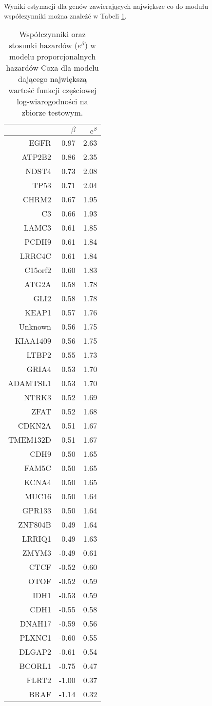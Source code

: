Wyniki estymacji dla genów zawierających największe co do modułu
współczynniki można znaleźć w Tabeli \ref{tabelka}.

\begin{table}[ht]
\centering
\begin{tabular}{rrr}
  \toprule
 & $\beta$ & $e^{\beta}$ \\ 
  \toprule
EGFR & 0.97 & 2.63 \\ 
  ATP2B2 & 0.86 & 2.35 \\ 
  NDST4 & 0.73 & 2.08 \\ 
  TP53 & 0.71 & 2.04 \\ 
  CHRM2 & 0.67 & 1.95 \\ 
  C3 & 0.66 & 1.93 \\ 
  LAMC3 & 0.61 & 1.85 \\ 
  PCDH9 & 0.61 & 1.84 \\ 
  LRRC4C & 0.61 & 1.84 \\ 
  C15orf2 & 0.60 & 1.83 \\ 
  ATG2A & 0.58 & 1.78 \\ 
  GLI2 & 0.58 & 1.78 \\ 
  KEAP1 & 0.57 & 1.76 \\ 
  Unknown & 0.56 & 1.75 \\ 
  KIAA1409 & 0.56 & 1.75 \\ 
  LTBP2 & 0.55 & 1.73 \\ 
  GRIA4 & 0.53 & 1.70 \\ 
  ADAMTSL1 & 0.53 & 1.70 \\ 
  NTRK3 & 0.52 & 1.69 \\ 
  ZFAT & 0.52 & 1.68 \\ 
  CDKN2A & 0.51 & 1.67 \\ 
  TMEM132D & 0.51 & 1.67 \\ 
  CDH9 & 0.50 & 1.65 \\ 
  FAM5C & 0.50 & 1.65 \\ 
  KCNA4 & 0.50 & 1.65 \\ 
  MUC16 & 0.50 & 1.64 \\ 
  GPR133 & 0.50 & 1.64 \\ 
  ZNF804B & 0.49 & 1.64 \\ 
  LRRIQ1 & 0.49 & 1.63 \\ 
  ZMYM3 & -0.49 & 0.61 \\ 
  CTCF & -0.52 & 0.60 \\ 
  OTOF & -0.52 & 0.59 \\ 
  IDH1 & -0.53 & 0.59 \\ 
  CDH1 & -0.55 & 0.58 \\ 
  DNAH17 & -0.59 & 0.56 \\ 
  PLXNC1 & -0.60 & 0.55 \\ 
  DLGAP2 & -0.61 & 0.54 \\ 
  BCORL1 & -0.75 & 0.47 \\ 
  FLRT2 & -1.00 & 0.37 \\ 
  BRAF & -1.14 & 0.32 \\ 
   \bottomrule
\end{tabular}
\caption{\label{tabelka}Współczynniki oraz stosunki hazardów ($e^{\beta}$) w modelu proporcjonalnych hazardów Coxa dla modelu dającego największą wartość funkcji częściowej log-wiarogodności na zbiorze testowym. }
\end{table}
